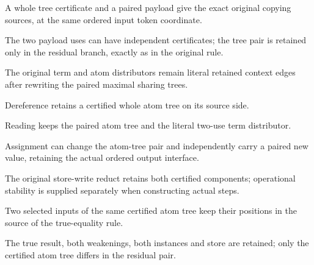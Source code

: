 A whole tree certificate and a paired payload give the exact original copying sources, at the same ordered input token coordinate.
\par{}

The two payload uses can have independent certificates; the tree pair is retained only in the residual branch, exactly as in the original rule.
\par{}

The original term and atom distributors remain literal retained context edges after rewriting the paired maximal sharing trees.
\par{}

Dereference retains a certified whole atom tree on its source side.
\par{}

Reading keeps the paired atom tree and the literal two-use term distributor.
\par{}

Assignment can change the atom-tree pair and independently carry a paired new value, retaining the actual ordered output interface.
\par{}

The original store-write reduct retains both certified components; operational stability is supplied separately when constructing actual steps.
\par{}

Two selected inputs of the same certified atom tree keep their positions in the source of the true-equality rule.
\par{}

The true result, both weakenings, both instances and store are retained; only the certified atom tree differs in the residual pair.
\par{}

